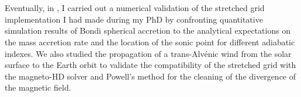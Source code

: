 \documentclass[a4paper,12pt,onecolumn]{article}
\begin{document}
\phantom{m}\\ \\
\indent Eventually, in \cite{Xia2017}, I carried out a numerical validation of the stretched grid implementation I had made during my PhD by confronting quantitative simulation results of Bondi spherical accretion to the analytical expectations on the mass accretion rate and the location of the sonic point for different adiabatic indexes. We also studied the propagation of a trans-Alv\'enic wind from the solar surface to the Earth orbit to validate the compatibility of the stretched grid with the magneto-HD solver and Powell's method for the cleaning of the divergence of the magnetic field.\\
%
%
%
%
\end{document}
